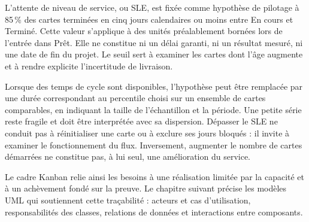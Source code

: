L'attente de niveau de service, ou SLE, est fixée comme hypothèse de pilotage à 85\,\% des cartes terminées en cinq jours calendaires ou moins entre En cours et Terminé. Cette valeur s'applique à des unités préalablement bornées lors de l'entrée dans Prêt. Elle ne constitue ni un délai garanti, ni un résultat mesuré, ni une date de fin du projet. Le seuil sert à examiner les cartes dont l'âge augmente et à rendre explicite l'incertitude de livraison.

Lorsque des temps de cycle sont disponibles, l'hypothèse peut être remplacée par une durée correspondant au percentile choisi sur un ensemble de cartes comparables, en indiquant la taille de l'échantillon et la période. Une petite série reste fragile et doit être interprétée avec sa dispersion. Dépasser le SLE ne conduit pas à réinitialiser une carte ou à exclure ses jours bloqués : il invite à examiner le fonctionnement du flux. Inversement, augmenter le nombre de cartes démarrées ne constitue pas, à lui seul, une amélioration du service.

Le cadre Kanban relie ainsi les besoins à une réalisation limitée par la capacité et à un achèvement fondé sur la preuve. Le chapitre suivant précise les modèles UML qui soutiennent cette traçabilité : acteurs et cas d'utilisation, responsabilités des classes, relations de données et interactions entre composants.
